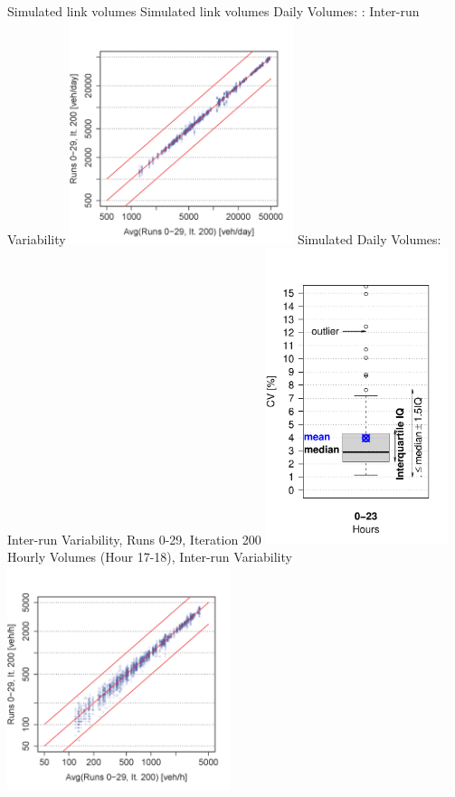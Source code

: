 \createfigure%
{Simulated link volumes}%
{Simulated link volumes}%
{\label{fig:linkVolumes}}%
{%
  \createsubfigure%
  {Daily Volumes: : Inter-run Variability}%
	{\includegraphics[width=0.49\textwidth]{understanding/figures/var/linkVolumesAWTVInterScatter.png}}%
	{\label{fig:linkVolumesAWTVInterScatter}}%
  {}%
	\createsubfigure%
  {Simulated Daily Volumes: Inter-run Variability, Runs 0-29, Iteration 200}%
	{\includegraphics[width=0.4\textwidth]{understanding/figures/var/linkVolumesInterAWTV200.pdf}}%
	{\label{fig:linkVolumesInterAWTV200}}%
  {}%
  \createsubfigure%
  {Hourly Volumes (Hour 17-18), Inter-run Variability}%
	{\includegraphics[width=0.49\textwidth]{understanding/figures/var/linkVolumesHour17-18InterScatter.png}}%
}
